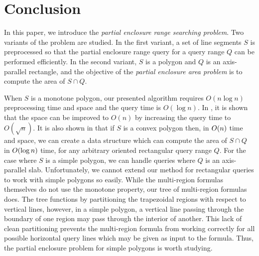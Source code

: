 \section{Conclusion}
\label{conclusion}

In this paper, we introduce the \emph{partial enclosure range searching 
problem}.
Two variants of the problem are studied. In the first variant, 
a set of line segments $S$ is preprocessed so that the partial enclosure range
query for a query range $Q$ can be performed efficiently. In the second 
variant, 
$S$ is a polygon and $Q$ is an axis-parallel rectangle, and the objective of 
the 
\emph{partial enclosure area problem} is to compute the area of $S \cap Q$. 

When $S$ is a monotone polygon, our presented algorithm requires $O(n\log n)$ 
preprocessing 
time and space and the query time is $O(\log n)$. In \cite{BINT}, it is shown 
that the space can be 
improved to $O(n)$ by increasing the query time to $O(\sqrt{n})$. It is also 
shown in \cite{BINT} that 
if $S$ is a convex polygon then, in $O\!\left(n\right)$ time and space, we can create a 
data structure which 
can compute the area of $S \cap Q$ in $O\!\left(\log{n}\right)$ time, for any arbitrary 
oriented rectangular 
query range $Q$. For the case where $S$ is a simple polygon, we can handle 
queries where $Q$ is an 
axis-parallel slab. Unfortunately, we cannot extend our method for rectangular 
queries to work with simple polygons so easily.
While the multi-region formulas themselves do not use the monotone property, our 
tree of multi-region formulas does. 
The tree functions by partitioning the trapezoidal regions with respect to 
vertical lines, however, in a simple polygon, a vertical line passing through 
the boundary of one region may pass through the interior of another. 
This lack of clean partitioning prevents the multi-region formula from working 
correctly for all possible horizontal query lines which may be given as input to 
the formula. Thus, the partial enclosure problem for simple polygons is worth studying. 
